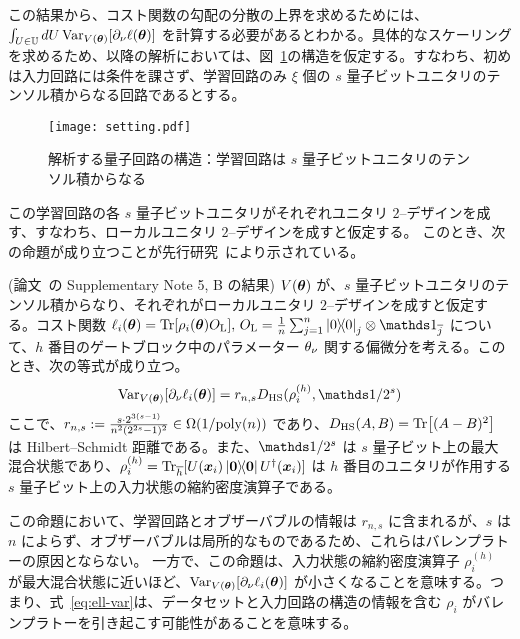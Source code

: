 この結果から、コスト関数の勾配の分散の上界を求めるためには、$\int_{U\in\mathbb{U}} dU \operatorname{Var}_{V(\boldsymbol{\theta})}[\partial_\nu \ell(\boldsymbol{\theta})]$ を計算する必要があるとわかる。具体的なスケーリングを求めるため、以降の解析においては、図~\ref{fig:circuit-setting}の構造を仮定する。すなわち、初めは入力回路には条件を課さず、学習回路のみ $\xi$ 個の $s$ 量子ビットユニタリのテンソル積からなる回路であるとする。
\begin{figure}[H]
    \centering
    \texttt{[image: setting.pdf]}
    \caption{解析する量子回路の構造：学習回路は $s$ 量子ビットユニタリのテンソル積からなる}
    \label{fig:circuit-setting}
\end{figure}

この学習回路の各 $s$ 量子ビットユニタリがそれぞれユニタリ $2$--デザインを成す、すなわち、ローカルユニタリ $2$--デザインを成すと仮定する。
このとき、次の命題が成り立つことが先行研究~\cite{cerezo2021cost}により示されている。
\begin{screen}
    \begin{proposition}\label{prop:qml-var-local-2-design}
        (論文~\cite{cerezo2021cost}の Supplementary Note 5, B の結果) 
        $V(\boldsymbol{\theta})$ が、$s$ 量子ビットユニタリのテンソル積からなり、それぞれがローカルユニタリ $2$--デザインを成すと仮定する。コスト関数 $\ell_i(\bs{\th}) = \Tr[\rho_i(\bs{\th})O_\rmL],\,O_\rmL = \frac{1}{n} \sum_{j=1}^{n}\dyad{0}_{j} \otimes \bbid_{\bar{j}}$ について、$h$ 番目のゲートブロック中のパラメーター $\theta_\nu$ 関する偏微分を考える。このとき、次の等式が成り立つ。
        \begin{align}
            \Var_{V(\bs{\th})}[\pd_\nu \ell_i(\bs{\th})] = r_{n,s}D_{\HS}(\rho_i^{(h)} , \bbid/2^s )\label{eq:ell-var}
        \end{align}
        ここで、$r_{n,s} := \frac{s\cdot 2^{3(s-1)}}{n^2(2^{2s}-1)^2} \in \Omega(1/\mathrm{poly}(n))$ であり、$D_{\mathrm{HS}}(A, B) = \Tr[(A - B)^2]$ は Hilbert--Schmidt 距離である。また、$\bbid/2^s$ は $s$ 量子ビット上の最大混合状態であり、$\rho_i^{(h)} = \Tr_{\bar h}[U(\bs{x}_i)\dyad{\bs{0}}U\dg(\bs{x}_i)]$ は $h$ 番目のユニタリが作用する $s$ 量子ビット上の入力状態の縮約密度演算子である。
    \end{proposition}
\end{screen}

この命題において、学習回路とオブザーバブルの情報は $r_{n,s}$ に含まれるが、$s$ は $n$ によらず、オブザーバブルは局所的なものであるため、これらはバレンプラトーの原因とならない。
一方で、この命題は、入力状態の縮約密度演算子 $\rho_i^{(h)}$ が最大混合状態に近いほど、$\operatorname{Var}_{V(\boldsymbol{\theta})}[\partial_\nu \ell_i(\boldsymbol{\theta})]$ が小さくなることを意味する。つまり、式~\eqref{eq:ell-var}は、データセットと入力回路の構造の情報を含む $\rho_i$ がバレンプラトーを引き起こす可能性があることを意味する。

